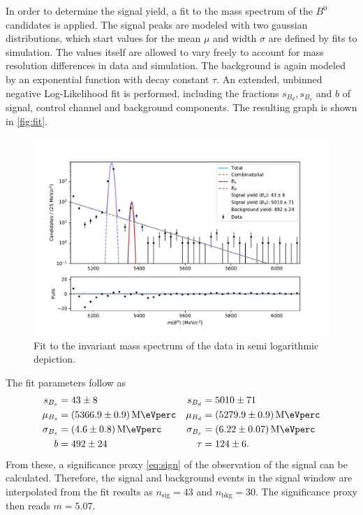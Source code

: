 In order to determine the signal yield, a fit to the mass spectrum of the $B^0$ candidates is applied. 
The signal peaks are modeled with two gaussian distributions, which start values for the mean $\mu$ and width $\sigma$ are defined by fits to simulation. The values itself 
are allowed to vary freely to account for mass resolution differences in data and simulation. 
The background is again modeled by an exponential function with decay constant $\tau$.
An extended, unbinned negative Log-Likelihood fit is performed, including the fractions $s_{B_d}, s_{B_s}$ and $b$ of signal, control channel and background components.
The resulting graph is shown in \autoref{fig:fit}.
\begin{figure}
  \centering
  \includegraphics[width = .9\textwidth]{"content/plots/final_fit.pdf"}
  \caption{Fit to the invariant mass spectrum of the data in semi logarithmic depiction.}
  \label{fig:fit}
\end{figure}
The fit parameters follow as 
\begin{align*}
  s_{B_s} &= \num{43 +- 8} & s_{B_d} &= \num{5010 +- 71} \\
  \mu_{B_s} &= \qty{5366.9 +- 0.9}{\mega\eVperc} & \mu_{B_d} &= \qty{5279.9 +- 0.9}{\mega\eVperc} \\
  \sigma_{B_s} &=  \qty{4.6 +- 0.8}{\mega\eVperc} & \sigma_{B_s} &=  \qty{6.22 +- 0.07}{\mega\eVperc} \\
  b &= \num{492 +- 24}  & \tau &= \num{124 +- 6}.
\end{align*}
From these, a significance proxy \autoref{eq:sign} of the observation of the signal can be calculated.
Therefore, the signal and background events in the signal window are interpolated from the fit results as $n_\text{sig} = \num{43}$ and $n_\text{bkg} = \num{30}$.
The significance proxy then reads $m = \num{5.07}$.
